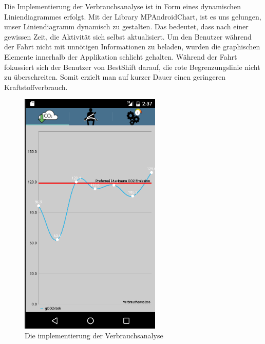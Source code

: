 Die Implementierung der Verbrauchsanalyse ist in Form eines dynamischen Liniendiagrammes erfolgt.
Mit der Library MPAndroidChart, ist es uns gelungen, unser Liniendiagramm dynamisch zu gestalten.
Das bedeutet, dass nach einer gewissen Zeit, die Aktivität sich selbst aktualisiert.
Um den Benutzer während der Fahrt nicht mit unnötigen Informationen zu beladen, wurden die graphischen
Elemente innerhalb der Applikation schlicht gehalten.
Während der Fahrt fokussiert sich der Benutzer von BestShift darauf, die rote Begrenzungslinie nicht zu überschreiten.
Somit erzielt man auf kurzer Dauer einen geringeren Kraftstoffverbrauch.
\begin{figure}
    \centering
    \includegraphics[width=0.6\textwidth]{images/verbrauch}
    \caption{Die implementierung der Verbrauchsanalyse \cite{BOZH.ch3-verbrauchsanalyse.verbrauch}}
\end{figure}


\clearpage %